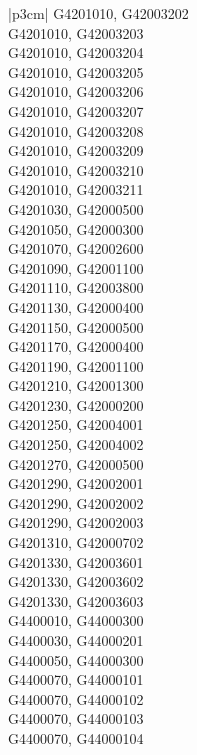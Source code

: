 \begin{customLongTable}{ |p{3cm}| }
G4201010, G42003202 \\ \hline
G4201010, G42003203 \\ \hline
G4201010, G42003204 \\ \hline
G4201010, G42003205 \\ \hline
G4201010, G42003206 \\ \hline
G4201010, G42003207 \\ \hline
G4201010, G42003208 \\ \hline
G4201010, G42003209 \\ \hline
G4201010, G42003210 \\ \hline
G4201010, G42003211 \\ \hline
G4201030, G42000500 \\ \hline
G4201050, G42000300 \\ \hline
G4201070, G42002600 \\ \hline
G4201090, G42001100 \\ \hline
G4201110, G42003800 \\ \hline
G4201130, G42000400 \\ \hline
G4201150, G42000500 \\ \hline
G4201170, G42000400 \\ \hline
G4201190, G42001100 \\ \hline
G4201210, G42001300 \\ \hline
G4201230, G42000200 \\ \hline
G4201250, G42004001 \\ \hline
G4201250, G42004002 \\ \hline
G4201270, G42000500 \\ \hline
G4201290, G42002001 \\ \hline
G4201290, G42002002 \\ \hline
G4201290, G42002003 \\ \hline
G4201310, G42000702 \\ \hline
G4201330, G42003601 \\ \hline
G4201330, G42003602 \\ \hline
G4201330, G42003603 \\ \hline
G4400010, G44000300 \\ \hline
G4400030, G44000201 \\ \hline
G4400050, G44000300 \\ \hline
G4400070, G44000101 \\ \hline
G4400070, G44000102 \\ \hline
G4400070, G44000103 \\ \hline
G4400070, G44000104 \\ \hline

\end{customLongTable}
